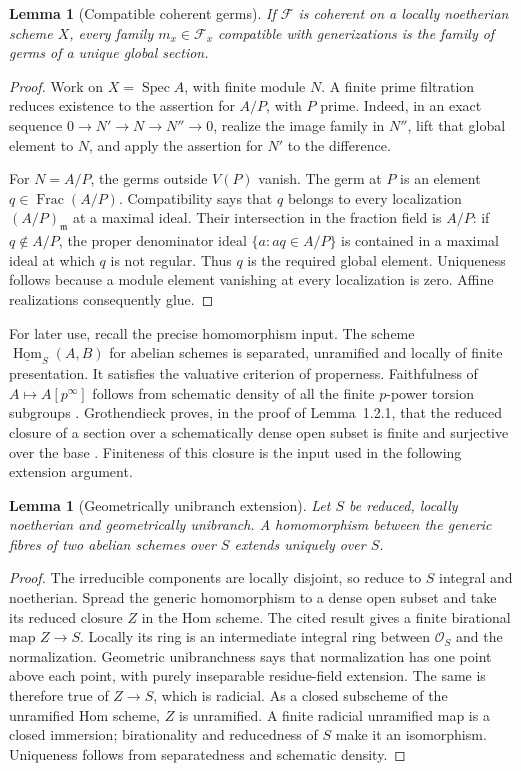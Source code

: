\documentclass[11pt]{article}
\newtheorem{lemma}[theorem]{Lemma}
\theoremstyle{definition}\newtheorem{definition}[theorem]{Definition}
\theoremstyle{remark}\newtheorem{remark}[theorem]{Remark}
\newcommand{\Spec}{\operatorname{Spec}}
\newcommand{\OO}{\mathcal O}
\newcommand{\Hom}{\operatorname{Hom}}
\begin{document}
\begin{lemma}[Compatible coherent germs]\label{lem:germs}
If $\mathcal F$ is coherent on a locally noetherian scheme $X$, every family $m_x\in\mathcal F_x$ compatible with generizations is the family of germs of a unique global section.
\end{lemma}
\begin{proof}
Work on $X=\Spec A$, with finite module $N$. A finite prime filtration reduces existence to the assertion for $A/P$, with $P$ prime. Indeed, in an exact sequence $0\to N'\to N\to N''\to0$, realize the image family in $N''$, lift that global element to $N$, and apply the assertion for $N'$ to the difference.

For $N=A/P$, the germs outside $V(P)$ vanish. The germ at $P$ is an element $q\in\operatorname{Frac}(A/P)$. Compatibility says that $q$ belongs to every localization $(A/P)_{\mathfrak m}$ at a maximal ideal. Their intersection in the fraction field is $A/P$: if $q\notin A/P$, the proper denominator ideal $\{a:aq\in A/P\}$ is contained in a maximal ideal at which $q$ is not regular. Thus $q$ is the required global element. Uniqueness follows because a module element vanishing at every localization is zero. Affine realizations consequently glue.
\end{proof}

For later use, recall the precise homomorphism input. The scheme $\underline{\Hom}_S(A,B)$ for abelian schemes is separated, unramified and locally of finite presentation. It satisfies the valuative criterion of properness. Faithfulness of $A\mapsto A[p^\infty]$ follows from schematic density of all the finite $p$-power torsion subgroups \citep[p.~60]{GrothHom}. Grothendieck proves, in the proof of Lemma~1.2.1, that the reduced closure of a section over a schematically dense open subset is finite and surjective over the base \citep[pp.~64--65]{GrothHom}. Finiteness of this closure is the input used in the following extension argument.

\begin{lemma}[Geometrically unibranch extension]\label{lem:unibranch}
Let $S$ be reduced, locally noetherian and geometrically unibranch. A homomorphism between the generic fibres of two abelian schemes over $S$ extends uniquely over $S$.
\end{lemma}
\begin{proof}
The irreducible components are locally disjoint, so reduce to $S$ integral and noetherian. Spread the generic homomorphism to a dense open subset and take its reduced closure $Z$ in the Hom scheme. The cited result gives a finite birational map $Z\to S$. Locally its ring is an intermediate integral ring between $\OO_S$ and the normalization. Geometric unibranchness says that normalization has one point above each point, with purely inseparable residue-field extension. The same is therefore true of $Z\to S$, which is radicial. As a closed subscheme of the unramified Hom scheme, $Z$ is unramified. A finite radicial unramified map is a closed immersion; birationality and reducedness of $S$ make it an isomorphism. Uniqueness follows from separatedness and schematic density.
\end{proof}
\end{document}
